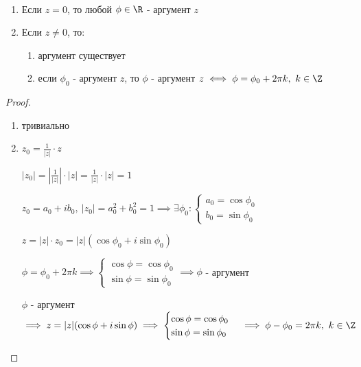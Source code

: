 \begin{theorem-non}~
    \begin{enumerate}
        \item Если $z = 0$, то любой $\phi \in \R$ - аргумент $z$
        
        \item Если $z \neq 0$, то:
        \begin{enumerate}
            \item аргумент существует
            
            \item если $\phi_0$ - аргумент $z$, то $\phi$ - аргумент $z \iff \phi = \phi_0 + 2 \pi k,~k \in \Z$
        \end{enumerate}
    \end{enumerate}
\end{theorem-non}

\begin{proof}
    \begin{enumerate}
        \item тривиально
        
        \item $z_0 = \frac{1}{|z|} \cdot z$ 
        
        $|z_0| = \left| \frac{1}{|z|} \right| \cdot |z| = \frac{1}{|z|} \cdot |z| = 1$
        
        $z_0 = a_0 + ib_0,~|z_0| = a_0^2 + b_0^2 = 1 \implies \exists \phi_0:
        \begin{cases}
            a_0 = \cos\phi_0\\
            b_0 = \sin\phi_0
        \end{cases}$

        $z = |z| \cdot z_0 = |z|(\cos\phi_0 + i\sin\phi_0)$

        $\phi = \phi_0 + 2 \pi k \implies
        \begin{cases}
            \cos\phi = \cos\phi_0\\
            \sin\phi = \sin\phi_0
        \end{cases} \implies \phi$ - аргумент

        $\phi$ - аргумент $\implies z = |z|(\cos\phi + i\sin\phi) \implies
        \begin{cases}
            \cos\phi = \cos\phi_0\\
            \sin\phi = \sin\phi_0
        \end{cases} \implies \phi - \phi_0 = 2 \pi k,~k \in \Z$
    \end{enumerate}
\end{proof}

